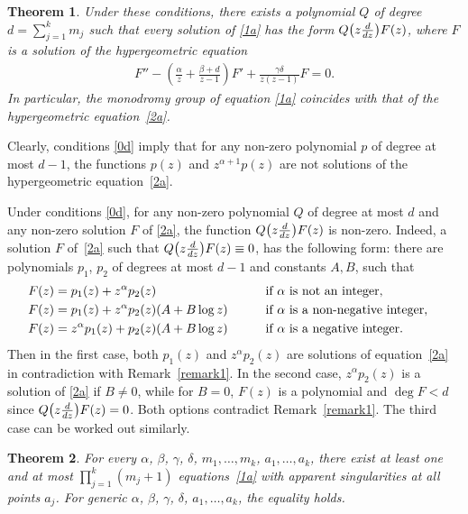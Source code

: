 \documentclass[11pt]{article}
\numberwithin{equation}{section}
\newtheorem{thm}{Theorem}[section]
\def\lc{,\allowbreak\ldots,\allowbreak}
\begin{document}
\begin{thm}\label{theorem1}
Under these conditions, there exists a polynomial $Q$ of degree $d=\sum\limits_{j=1}^km_j$ such that every solution of \eqref{1a} has the form $Q\big(z\frac{{\rm d}}{{\rm d}z}\big)F(z) $, where $F$ is a solution of the hypergeometric equation
\begin{gather}\label{2a}
F''-\left( \frac\alpha z+\frac{\beta+d}{z-1} \right) F'+\frac{\gamma\delta}{z(z-1)} F = 0.
\end{gather}
In particular, the monodromy group of equation \eqref{1a} coincides with that of the hypergeometric equation~\eqref{2a}.
\end{thm}

\begin{Remark}\label{remark1} Clearly, conditions \eqref{0d} imply that for any non-zero polynomial $p$ of degree at most $d-1$, the functions $p(z)$ and $z^{\alpha+1}p(z)$ are not solutions of the hypergeometric equation~\eqref{2a}.
\end{Remark}

\begin{Remark}\label{remark2} Under conditions \eqref{0d}, for any non-zero polynomial $Q$ of degree at most $d$ and any non-zero solution $F$ of \eqref{2a}, the function $Q\big(z\frac{{\rm d}}{{\rm d}z}\big)F(z)$ is non-zero. Indeed, a solution $F$ of~\eqref{2a} such that $Q\big(z\frac{{\rm d}}{{\rm d}z}\big)F(z)\equiv 0$, has the following form: there are polynomials $p_1$, $p_2$ of degrees at most $d-1$ and constants $A,B$, such that
\begin{alignat*}{3}
& F(z) = p_1(z) + z^\alpha p_2(z)\qquad && \hbox{\rm if $\alpha$ is not an integer},&\\
& F(z) = p_1(z) + z^\alpha p_2(z) (A+B\log z)\qquad && \hbox{\rm if $\alpha$ is a non-negative integer},&\\
& F(z) = z^\alpha p_1(z) + p_2(z) (A+B\log z)\qquad && \hbox{\rm if $\alpha$ is a negative integer}. &
\end{alignat*}
Then in the first case, both $p_1(z)$ and $z^\alpha p_2(z)$ are solutions of equation~\eqref{2a} in contradiction with Remark~\ref{remark1}. In the second case, $z^\alpha p_2(z)$ is a solution of \eqref{2a} if $B\ne 0$, while for $B=0$, $F(z)$ is a polynomial and $ \deg F<d$ since $Q\big(z\frac{{\rm d}}{{\rm d}z}\big)F(z)=0$. Both options contradict Remark~\ref{remark1}. The third case can be worked out similarly.
\end{Remark}

\begin{thm}\label{theorem2}
For every $\alpha$, $\beta$, $\gamma$, $\delta$, $m_1\lc m_k$, $a_1\lc a_k$, there exist at least one and at most $\prod\limits_{j=1}^k(m_j+1)$ equations~\eqref{1a} with apparent singularities at all points $a_j$. For generic $\alpha$, $\beta$, $\gamma$, $\delta$, $a_1\lc a_k$, the equality holds.
\end{thm}
\end{document}
